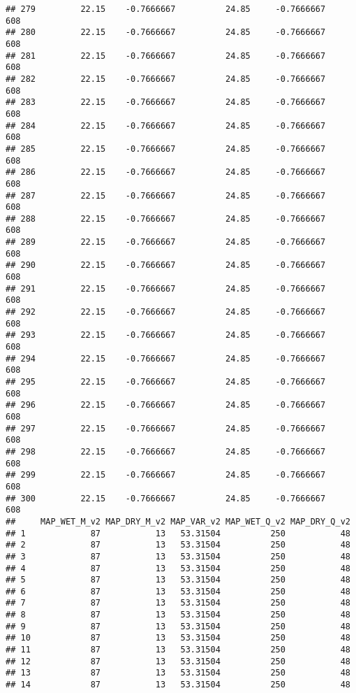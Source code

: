 \documentclass[]{article}
\begin{document}
\begin{verbatim}
## 279         22.15    -0.7666667          24.85     -0.7666667    608
## 280         22.15    -0.7666667          24.85     -0.7666667    608
## 281         22.15    -0.7666667          24.85     -0.7666667    608
## 282         22.15    -0.7666667          24.85     -0.7666667    608
## 283         22.15    -0.7666667          24.85     -0.7666667    608
## 284         22.15    -0.7666667          24.85     -0.7666667    608
## 285         22.15    -0.7666667          24.85     -0.7666667    608
## 286         22.15    -0.7666667          24.85     -0.7666667    608
## 287         22.15    -0.7666667          24.85     -0.7666667    608
## 288         22.15    -0.7666667          24.85     -0.7666667    608
## 289         22.15    -0.7666667          24.85     -0.7666667    608
## 290         22.15    -0.7666667          24.85     -0.7666667    608
## 291         22.15    -0.7666667          24.85     -0.7666667    608
## 292         22.15    -0.7666667          24.85     -0.7666667    608
## 293         22.15    -0.7666667          24.85     -0.7666667    608
## 294         22.15    -0.7666667          24.85     -0.7666667    608
## 295         22.15    -0.7666667          24.85     -0.7666667    608
## 296         22.15    -0.7666667          24.85     -0.7666667    608
## 297         22.15    -0.7666667          24.85     -0.7666667    608
## 298         22.15    -0.7666667          24.85     -0.7666667    608
## 299         22.15    -0.7666667          24.85     -0.7666667    608
## 300         22.15    -0.7666667          24.85     -0.7666667    608
##     MAP_WET_M_v2 MAP_DRY_M_v2 MAP_VAR_v2 MAP_WET_Q_v2 MAP_DRY_Q_v2
## 1             87           13   53.31504          250           48
## 2             87           13   53.31504          250           48
## 3             87           13   53.31504          250           48
## 4             87           13   53.31504          250           48
## 5             87           13   53.31504          250           48
## 6             87           13   53.31504          250           48
## 7             87           13   53.31504          250           48
## 8             87           13   53.31504          250           48
## 9             87           13   53.31504          250           48
## 10            87           13   53.31504          250           48
## 11            87           13   53.31504          250           48
## 12            87           13   53.31504          250           48
## 13            87           13   53.31504          250           48
## 14            87           13   53.31504          250           48

\end{verbatim}
\end{document}
